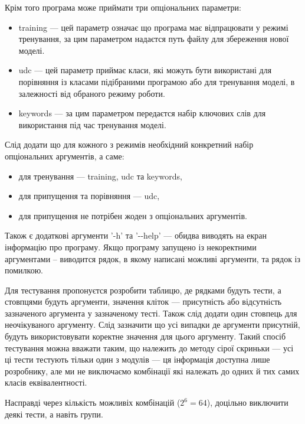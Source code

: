 \documentclass[14pt]{extarticle}
\begin{document}
  Крім того програма може приймати три опціональних параметри:
  \begin{itemize}[labelindent=\dimexpr{}\relax, leftmargin=*]
    \item training --- цей параметр означає що програма має відпрацювати
      у режимі тренування,
      за цим параметром надаєтся путь файлу для збереження нової моделі.
    \item udc --- цей параметр приймає класи,
      які можуть бути використані для порівняння із класами
      підібраними програмою або для тренування моделі,
      в залежності від обраного режиму роботи.
    \item keywords --- за цим параметром передаєтся набір ключових слів
      для використання під час тренування моделі.
  \end{itemize}

  Слід додати що для кожного з режимів необхідний конкретний
  набір опціональних аргументів, а саме:
  \begin{itemize}[labelindent=\dimexpr{}\relax, leftmargin=*]
    \item для тренування --- training, udc та keywords,
    \item для припущення та порівняння --- udc,
    \item для припущення не потрібен жоден з опціональних аргументів.
  \end{itemize}

  Також є додаткові аргументи '-h' та '-{}-help' ---
  обидва виводять на екран інформацію про програму.
  Якщо програму запущено із некоректними аргументами -- виводится рядок,
  в якому написані можливі аргументи, та рядок із помилкою.

  Для тестування пропонуєтся розробити таблицю, де рядками будуть тести,
  а стовпцями будуть аргументи, значення кліток ---
  присутність або відсутність зазначеного аргумента у зазначеному тесті.
  Також слід додати один стовпець для неочікуваного аргументу.
  Слід зазначити що усі випадки де аргументи присутній,
  будуть використовувати коректне значення для цього аргументу.
  Такий спосіб тестування можна вважати таким,
  що належить до методу сірої скриньки ---
  усі ці тести тестують тільки один з модулів ---
  ця інформація доступна лише розробнику, але ми не виключаємо комбінації
  які належать до одних й тих самих класів еквівалентності.

  Насправді через кількість можливіх комбінацій ($2^6 = 64$),
  доцільно виключити деякі тести, а навіть групи.
\end{document}
